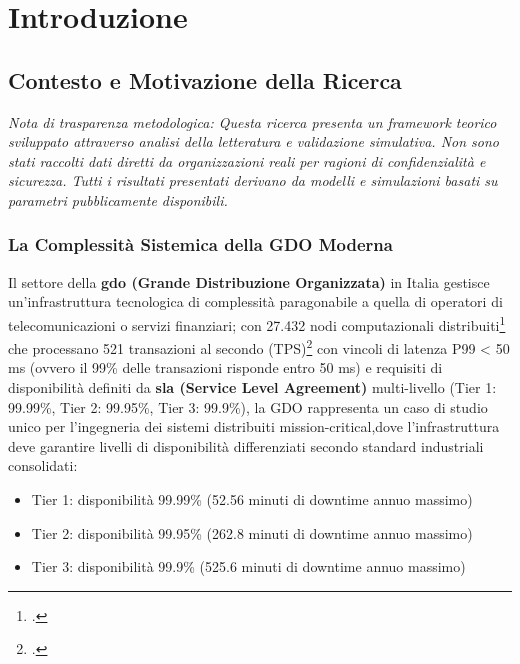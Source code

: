 \chapter{\texorpdfstring{\textbf{Introduzione}}{Capitolo 1 - Introduzione}}\label{capitolo-1-introduzione}

\section{\texorpdfstring{\textbf{Contesto e Motivazione della
Ricerca}}{Contesto e Motivazione della Ricerca}}\label{contesto-e-motivazione-della-ricerca}
\textit{Nota di trasparenza metodologica: Questa ricerca presenta un framework 
teorico sviluppato attraverso analisi della letteratura e validazione 
simulativa. Non sono stati raccolti dati diretti da organizzazioni reali 
per ragioni di confidenzialità e sicurezza. Tutti i risultati presentati 
derivano da modelli e simulazioni basati su parametri pubblicamente disponibili.}
\subsection{\texorpdfstring{\textbf{La Complessità Sistemica
della GDO
Moderna}}{La Complessità Sistemica della GDO Moderna}}\label{la-complessità-sistemica-della-gdo-moderna}

Il settore della \textbf{\gls{gdo} (Grande Distribuzione Organizzata)} in Italia gestisce
un'infrastruttura tecnologica di complessità paragonabile a quella di
operatori di telecomunicazioni o servizi finanziari; con 27.432 nodi computazionali distribuiti\footcite{istat2024struttura} che processano 521 transazioni al secondo (TPS)\footcite{federdistribuzione2024mappa} con vincoli di latenza P99 < 50 ms (ovvero il 99\% delle transazioni risponde entro 50 ms) e requisiti di disponibilità definiti da \textbf{\gls{sla} (Service Level Agreement)} multi-livello (Tier 1: 99.99\%, Tier 2: 99.95\%, Tier 3: 99.9\%), la GDO rappresenta un caso di studio unico per l'ingegneria dei sistemi distribuiti mission-critical,dove l'infrastruttura deve garantire livelli di disponibilità differenziati secondo 
standard industriali consolidati:
\begin{itemize}
    \item Tier 1: disponibilità 99.99\% (52.56 minuti di downtime annuo massimo)
    \item Tier 2: disponibilità 99.95\% (262.8 minuti di downtime annuo massimo)  
    \item Tier 3: disponibilità 99.9\% (525.6 minuti di downtime annuo massimo)
\end{itemize}

